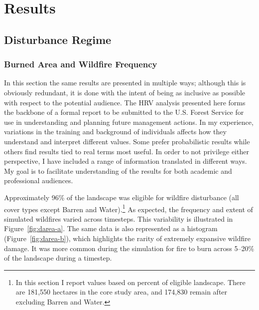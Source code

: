 \section{Results}
\label{sec:hrvresults}
\subsection{Disturbance Regime}

\subsubsection{Burned Area and Wildfire Frequency}


In this section the same results are presented in multiple ways; although this is obviously redundant, it is done with the intent of being as inclusive as possible with respect to the potential audience. The HRV analysis presented here forms the backbone of a formal report to be submitted to the U.S. Forest Service for use in understanding and planning future management actions. In my experience, variations in the training and background of individuals affects how they understand and interpret different values. Some prefer probabilistic results while others find results tied to real terms most useful. In order to not privilege either perspective, I have included a range of information translated in different ways. My goal is to facilitate understanding of the results for both academic and professional audiences.

Approximately 96\% of the landscape was eligible for wildfire disturbance (all cover types except Barren and Water).\footnote{In this section I report values based on percent of eligible landscape. There are 181,550 hectares in the core study area, and 174,830 remain after excluding Barren and Water.} As expected, the frequency and extent of simulated wildfires varied across timesteps. This variability is illustrated in Figure~\ref{fig:darea-a}. The same data is also represented as a histogram (Figure~\ref{fig:darea-b}), which highlights the rarity of extremely expansive wildfire damage. It was more common during the simulation for fire to burn across 5--20\% of the landscape during a timestep.

